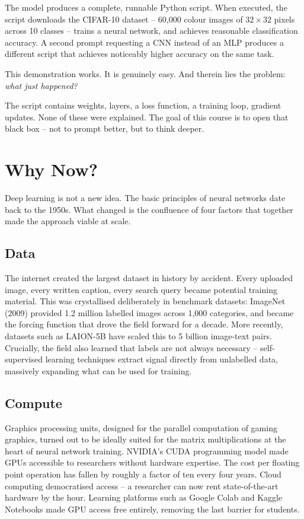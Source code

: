 The model produces a complete, runnable Python script. When executed, the script downloads the CIFAR-10 dataset -- 60,000 colour images of $32 \times 32$ pixels across 10 classes -- trains a neural network, and achieves reasonable classification accuracy. A second prompt requesting a CNN instead of an MLP produces a different script that achieves noticeably higher accuracy on the same task.

This demonstration works. It is genuinely easy. And therein lies the problem: \textit{what just happened?}

The script contains weights, layers, a loss function, a training loop, gradient updates. None of these were explained. The goal of this course is to open that black box -- not to prompt better, but to think deeper.

\section{Why Now?}

Deep learning is not a new idea. The basic principles of neural networks date back to the 1950s. What changed is the confluence of four factors that together made the approach viable at scale.

\subsection{Data}

The internet created the largest dataset in history by accident. Every uploaded image, every written caption, every search query became potential training material. This was crystallised deliberately in benchmark datasets: ImageNet (2009) provided 1.2 million labelled images across 1,000 categories, and became the forcing function that drove the field forward for a decade. More recently, datasets such as LAION-5B have scaled this to 5 billion image-text pairs. Crucially, the field also learned that labels are not always necessary -- self-supervised learning techniques extract signal directly from unlabelled data, massively expanding what can be used for training.

\subsection{Compute}

Graphics processing units, designed for the parallel computation of gaming graphics, turned out to be ideally suited for the matrix multiplications at the heart of neural network training. NVIDIA's CUDA programming model made GPUs accessible to researchers without hardware expertise. The cost per floating point operation has fallen by roughly a factor of ten every four years. Cloud computing democratised access -- a researcher can now rent state-of-the-art hardware by the hour. Learning platforms such as Google Colab and Kaggle Notebooks made GPU access free entirely, removing the last barrier for students.

